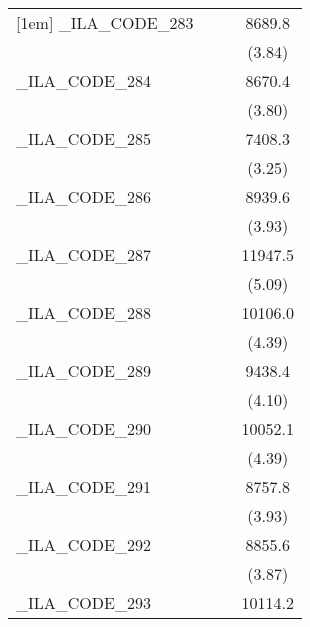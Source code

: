 {\begin{tabular}{l*{3}{c}}
[1em]
\_ILA\_CODE\_283&                     &                     &      8689.8\sym{***}\\
            &                     &                     &      (3.84)         \\
[1em]
\_ILA\_CODE\_284&                     &                     &      8670.4\sym{***}\\
            &                     &                     &      (3.80)         \\
[1em]
\_ILA\_CODE\_285&                     &                     &      7408.3\sym{**} \\
            &                     &                     &      (3.25)         \\
[1em]
\_ILA\_CODE\_286&                     &                     &      8939.6\sym{***}\\
            &                     &                     &      (3.93)         \\
[1em]
\_ILA\_CODE\_287&                     &                     &     11947.5\sym{***}\\
            &                     &                     &      (5.09)         \\
[1em]
\_ILA\_CODE\_288&                     &                     &     10106.0\sym{***}\\
            &                     &                     &      (4.39)         \\
[1em]
\_ILA\_CODE\_289&                     &                     &      9438.4\sym{***}\\
            &                     &                     &      (4.10)         \\
[1em]
\_ILA\_CODE\_290&                     &                     &     10052.1\sym{***}\\
            &                     &                     &      (4.39)         \\
[1em]
\_ILA\_CODE\_291&                     &                     &      8757.8\sym{***}\\
            &                     &                     &      (3.93)         \\
[1em]
\_ILA\_CODE\_292&                     &                     &      8855.6\sym{***}\\
            &                     &                     &      (3.87)         \\
[1em]
\_ILA\_CODE\_293&                     &                     &     10114.2\sym{***}\\

\end{tabular}}
